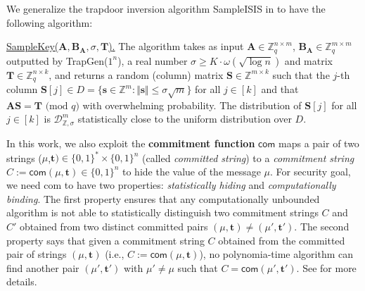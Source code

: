 \documentclass[runningheads]{llncs}
\begin{document}
We generalize the trapdoor inversion algorithm \textsf{SampleISIS} in \cite[Subsection 5.3]{GPV08}  to have the following algorithm:

\underline{\textsf{SampleKey($\mathbf{A}, \mathbf{B}_{\mathbf{A}}, \sigma, \mathbf{T}$)}.} The algorithm takes as input $\mathbf{A}\in \mathbb{Z}_q^{n \times m}$, $\mathbf{B}_{\mathbf{A}}\in \mathbb{Z}_q^{m \times m}$ outputted by \textsf{TrapGen($1^n$)}, a real number $\sigma \geq K \cdot \omega(\sqrt{\log n})$ and  matrix $ \mathbf{T} \in \mathbb{Z}_q^{n \times k}$, and returns a random (column) matrix $\mathbf{S} \in \mathbb{Z}^{m \times k}$ such that the $j$-th column $\mathbf{S}[j] \in D= \{\mathbf{s} \in \mathbb{Z}^m: \Vert \mathbf{s} \Vert \leq \sigma\sqrt{m} \}$ for all $j\in[k]$ and that $\mathbf{A}\mathbf{S}=\mathbf{T} \text{ (mod } q)$ with overwhelming probability. The distribution of $\mathbf{S}[j]$ for all $j \in [k]$ is $\mathcal{D}^{m}_{\mathbb{Z},\sigma}$ statistically close to the uniform distribution over $D$.



In this work, we also exploit the \textbf{commitment function}
$\mathsf{com}$ maps a pair of two strings ($\mu$,$\mathbf{t}) \in \{0,1\}^* \times \{0,1\}^n$ (called \textit{committed string}) to a \textit{commitment string}  $C:=\mathsf{com}(\mu, \mathbf{t}) \in\{0,1\}^n$ to hide the value of the message $\mu$. For security goal, we need \textsf{com} to have two properties: \textit{statistically hiding} and \textit{computationally binding}.
The first property ensures that any computationally unbounded algorithm is not able to statistically distinguish two commitment strings $C$ and $C'$ obtained from two distinct committed pairs $(\mu, \mathbf{t}) \neq (\mu', \mathbf{t}')$. The second property says that given a commitment string $C$ obtained from the committed pair of strings $(\mu, \mathbf{t})$ (i.e., $C:=\mathsf{com}(\mu, \mathbf{t})$), no polynomia-time algorithm can find another pair $(\mu', \mathbf{t}')$ with $\mu' \neq \mu$ such that $C=\mathsf{com}(\mu', \mathbf{t}')$. See \cite{HM96, AKKJ08, Ruc10} for more details.
\end{document}
